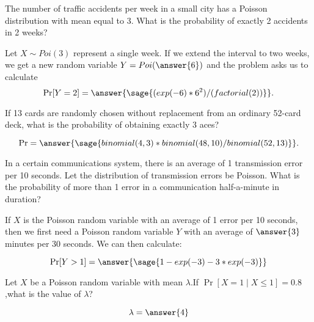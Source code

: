 \documentclass{ximera}
\begin{document}
\begin{problem} The number of traffic accidents per week in a small city has a Poisson distribution with mean equal to 3. What is the probability of exactly 2 accidents in 2 weeks? 

\begin{prompt}
Let $X\sim Poi(3)$ represent a single week. If we extend the interval to two weeks, we get a new random variable $Y=Poi(\answer{6})$ and the problem asks us to calculate
$$\Pr[Y=2]=\answer{\sage{(exp(-6)*6^2)/(factorial(2))}}.$$
\end{prompt}

\end{problem}

\begin{problem}
If 13 cards are randomly chosen without replacement from an ordinary 52-card deck, what is the probability of obtaining exactly 3 aces? 

\begin{prompt}
$$\Pr=\answer{\sage{binomial(4,3)*binomial(48,10)/binomial(52,13)}}.$$
\end{prompt}

\end{problem}

\begin{problem}
In a certain communications system, there is an average of 1 transmission error per 10 seconds. Let the distribution of transmission errors be Poisson. What is the probability of more than 1 error in a communication half-a-minute in duration? 



\begin{prompt}
If $X$ is the Poisson random variable with an average of 1 error per 10 seconds, then we first need a Poisson random variable $Y$ with an average of $\answer{3}$ minutes per 30 seconds. We can then calculate:

$$\Pr[Y>1]=\answer{\sage{1-exp(-3)-3*exp(-3)}}$$
\end{prompt}

\end{problem}

\begin{problem}
Let $X$ be a Poisson random variable with mean $\lambda$.If $\Pr[X=1\mid X\leq1]=0.8$,what is the value of $ \lambda$? 
\begin{prompt}
$$\lambda=\answer{4}$$
\end{prompt}

\end{problem}
\end{document}
